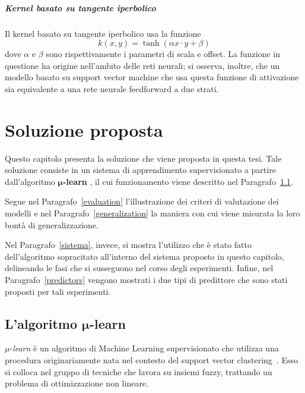 \documentclass[12pt]{report}
\theoremstyle{definition}
\begin{document}
\paragraph{Kernel basato su tangente iperbolico}
Il kernel basato su tangente iperbolico usa la funzione
\begin{equation}
    k(x,y) = \tanh(\alpha x \cdot y + \beta)
\end{equation}
dove $\alpha$ e $\beta$ sono rispettivamente i parametri di scala e offset. La funzione in questione ha origine nell'ambito delle reti neurali; si osserva, inoltre, che un modello basato su support vector machine che usa questa funzione di attivazione sia equivalente a una rete neurale feedforward a due strati.

\chapter{Soluzione proposta}
\label{Capitolo 2}
\onehalfspacing
Questo capitolo presenta la soluzione che viene proposta in questa tesi.
Tale soluzione consiste in un sistema di apprendimento supervisionato a partire dall'algoritmo $\bm{\mu}$\textbf{-learn} \cite{1}, il cui funzionamento viene descritto nel Paragrafo~\ref{mulearn}.

Segue nel Paragrafo~\ref{evaluation} l'illustrazione dei criteri di valutazione dei modelli e nel Paragrafo~\ref{generalization} la maniera con cui viene misurata la loro bontà di generalizzazione.

Nel Paragrafo~\ref{sistema}, invece, si mostra l'utilizzo che è stato fatto dell'algoritmo sopracitato all'interno del sistema proposto in questo capitolo, delineando le fasi che si susseguono nel corso degli esperimenti. Infine, nel Paragrafo~\ref{predictors} vengono mostrati i due tipi di predittore che sono stati proposti per tali esperimenti.

\section[\texorpdfstring{L'algoritmo $\mu$-learn}%
                        {mu-learn}]%
        {L'algoritmo $\bm{\mu}$-learn}  %
\label{mulearn}
$\mu$-\textit{learn} è un algoritmo di Machine Learning supervisionato che utilizza una procedura originariamente nata nel contesto del support vector clustering~\cite{23}.
Esso si colloca nel gruppo di tecniche che lavora su insiemi fuzzy, trattando un problema di ottimizzazione non lineare.
\end{document}
